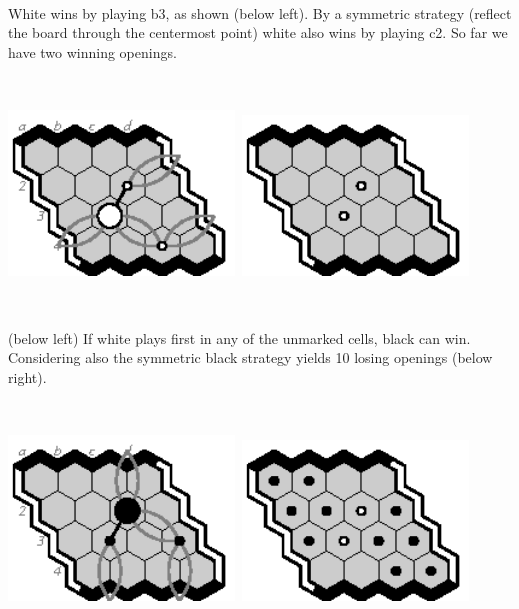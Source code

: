 \documentclass[12pt]{article}
\begin{document}
~

White wins by playing b3, as shown (below left).
By a symmetric strategy (reflect the board through the 
centermost point) white also wins by playing c2.
So far we have two winning openings.

~

\includegraphics[width=60mm]{fz/pix/4.1strat2.eps}\
\includegraphics[width=60mm]{fz/pix/4x4.winners0.eps}

~

\newpage
(below left) If white plays first in any of the unmarked cells,
black can win. Considering also the 
symmetric black strategy yields 10 losing openings (below right).

~

\includegraphics[width=60mm]{fz/pix/4.1strat.eps}\
\includegraphics[width=60mm]{fz/pix/4x4.winners1.eps}
\end{document}
